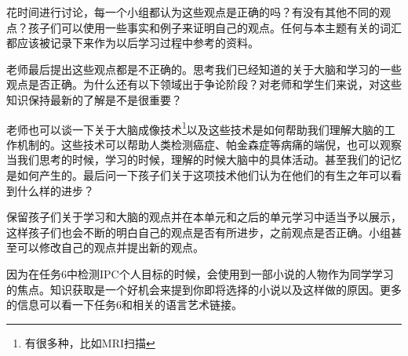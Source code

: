     花时间进行讨论，每一个小组都认为这些观点是正确的吗？有没有其他不同的观点？孩子们可以使用一些事实和例子来证明自己的观点。任何与本主题有关的词汇都应该被记录下来作为以后学习过程中参考的资料。\par
    老师最后提出这些观点都是不正确的。思考我们已经知道的关于大脑和学习的一些观点是否正确。为什么还有以下领域出于争论阶段？对老师和学生们来说，对这些知识保持最新的了解是不是很重要？\par
    老师也可以谈一下关于大脑成像技术\footnote{有很多种，比如MRI扫描}以及这些技术是如何帮助我们理解大脑的工作机制的。这些技术可以帮助人类检测癌症、帕金森症等病痛的端倪，也可以观察当我们思考的时候，学习的时候，理解的时候大脑中的具体活动。甚至我们的记忆是如何产生的。最后问一下孩子们关于这项技术他们认为在他们的有生之年可以看到什么样的进步？\par
    保留孩子们关于学习和大脑的观点并在本单元和之后的单元学习中适当予以展示，这样孩子们也会不断的明白自己的观点是否有所进步，之前观点是否正确。小组甚至可以修改自己的观点并提出新的观点。\par
    \begin{note}
      因为在任务6中检测IPC个人目标的时候，会使用到一部小说的人物作为同学学习的焦点。知识获取是一个好机会来提到你即将选择的小说以及这样做的原因。更多的信息可以看一下任务6和相关的语言艺术链接。
    \end{note}  
